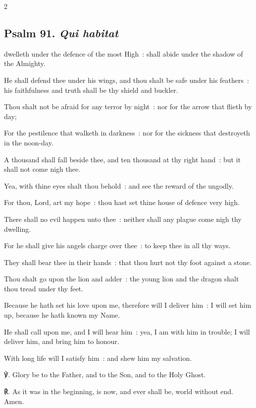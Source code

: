 \begin{multicols}{2}
\newcolumn

\subsection{Psalm 91. \textit{Qui habitat}}
 dwelleth under the defence of the most High~: shall abide under the shadow of the Almighty.\par
{}
He shall defend thee under his wings, and thou shalt be safe under his feathers~: his faithfulness and truth shall be thy shield and buckler.\par
{}Thou shalt not be afraid for any terror by night~: nor for the arrow that flieth by day;\par
{}For the pestilence that walketh in darkness~: nor for the sickness that destroyeth in the noon-day.\par
{}A thousand shall fall beside thee, and ten thousand at thy right hand~: but it shall not come nigh thee.\par
{}Yea, with thine eyes shalt thou behold~: and see the reward of the ungodly.\par
{}For thou, Lord, art my hope~: thou hast set thine house of defence very high.\par
{}There shall no evil happen unto thee~: neither shall any plague come nigh thy dwelling.\par
{}For he shall give his angels charge over thee~: to keep thee in all thy ways.\par
{}They shall bear thee in their hands~: that thou hurt not thy foot against a stone.\par
{}Thou shalt go upon the lion and adder~: the young lion and the dragon shalt thou tread under thy feet.\par
{}Because he hath set his love upon me, therefore will I deliver him~: I will set him up, because he hath known my Name.\par
{}He shall call upon me, and I will hear him~: yea, I am with him in trouble; I will deliver him, and bring him to honour.\par
{}With long life will I satisfy him~: and shew him my salvation.\par
℣. Glory be to the Father, and to the Son, and to the Holy Ghost.\par
℟. As it was in the beginning, is now, and ever shall be, world without end. Amen.


\end{multicols}
